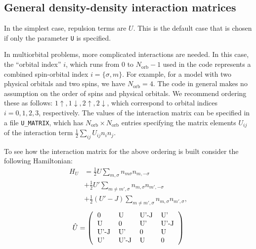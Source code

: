 \documentclass[aps,prb,floatfix,superscriptaddress,twocolumn,notitlepage]{revtex4-1}
\begin{document}
\subsection{General density-density interaction matrices}
\label{umatrix}
In the simplest case, repulsion terms are $U$. This is the default case that is chosen if only the parameter \verb#U# is specified.

In multiorbital problems, more complicated interactions are needed.
In this case, the ``orbital index'' $i$, which runs from $0$ to $N_{\text{orb}}-1$ used in the code represents a combined spin-orbital index $i=\{\sigma,m\}$. For example, for a model with two physical orbitals and two spins, we have $N_{\text{orb}}=4$.
The code in general makes no assumption on the order of spins and physical orbitals. 
We recommend ordering these as follows: $1\uparrow, 1\downarrow, 2\uparrow, 2\downarrow$, which correspond to orbital indices $i=0,1,2,3$, respectively.
The values of the interaction matrix can be specified in a file \verb#U_MATRIX#, which has $N_\text{orb}\times N_\text{orb}$ entries specifying the matrix elements $U_{ij}$ of the interaction term $\frac{1}{2}\sum_{ij}U_{ij}n_i n_j$.

To see how the interaction matrix for the above ordering is built consider the following Hamiltonian:
\begin{align}
H_{U} &=\frac{1}{2}U\sum_{m,\sigma} n_{m\sigma}n_{m,-\sigma} \\ \nonumber &+ \frac{1}{2}U'\sum_{m\neq m',\sigma}n_{m,\sigma}n_{m',-\sigma}
\\ \nonumber&+ \frac{1}{2}(U'-J)\sum_{m\neq m',\sigma} n_{m,\sigma}n_{m',\sigma}, 
\end{align}
\begin{equation}
\hat{U}=\left(\begin{tabular}{llll}
0 & U & U'-J & U'\\
U & 0 & U' & U'-J\\
U'-J & U' & 0 & U\\
U' & U'-J & U & 0\\
\end{tabular}\right)
\end{equation}
\end{document}
